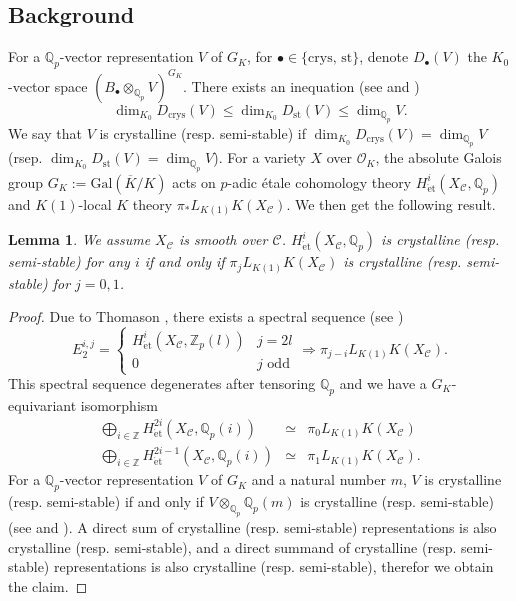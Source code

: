 \documentclass[11pt]{amsart}
\newcommand{\Q}{\mathbb{Q}}
\newcommand{\Z}{\mathbb{Z}}
\newcommand{\sC}{\mathcal{C}}
\newcommand{\sO}{\mathcal{O}}
\newcommand{\LK}{{L_{K(1)}}}
\newcommand{\et}{{\operatorname{\acute{e}t}}}
\newcommand{\ol}{\overline}
\newcounter{spec}
\newtheorem{lemma}{Lemma}[section]
\theoremstyle{definition}
\theoremstyle{remark}
\numberwithin{equation}{section}
\begin{document}
\subsection{Background} For a $\Q_p$-vector representation $V$ of $G_K$, for $\bullet\in \{\text{crys, st}\}$, denote $D_\bullet(V)$ the $K_0$-vector space $(B_\bullet\otimes_{\Q_p}V)^{G_K}$. There exists an inequation (see \cite{Fontainecrys} and \cite{Fontainesemi})
\[
\dim_{K_0}D_{\text{crys}}(V) \leq \dim_{K_0}D_{\text{st}}(V) \leq \dim_{\Q_p} V.
\]
We say that $V$ is crystalline (resp. semi-stable) if $\dim_{K_0}D_{\text{crys}}(V)=\dim_{\Q_p} V$ (rsep. $\dim_{K_0}D_{\text{st}}(V) = \dim_{\Q_p} V$). For a variety $X$ over $\sO_K$, the absolute Galois group $G_K:=\text{Gal}(\ol{K}/K)$ acts on $p$-adic \'etale cohomology theory $H^i_{\et}(X_\sC,\Q_p)$ and $K(1)$-local $K$ theory $\pi_*\LK K(X_\sC)$. We then get the following result.
\begin{lemma}
 We assume $X_\sC$ is smooth over $\sC$. $H^i_{\et}(X_\sC,\Q_p)$ is crystalline (resp. semi-stable) for any $i$ if and only if $\pi_j\LK K(X_\sC)$ is crystalline (resp. semi-stable) for $j=0,1$.
\end{lemma}
\begin{proof}
Due to Thomason \cite{Thomason}, there exists a spectral sequence (see \cite[(0.1)]{Thomason})
\begin{equation}\label{bakido}
E_2^{i,j}=\left\{
\begin{array}{ll}
H^{i}_\et(X_\sC,\Z_p(l)) & j = 2l \\
0 & j \text{ odd} 
\end{array}
\right. \Longrightarrow \pi_{j-i} L_{K(1)}K(X_\sC).
\end{equation} 
This spectral sequence degenerates after tensoring $\mathbb{Q}_p$ and we have a $G_K$-equivariant isomorphism
\begin{eqnarray}
  \bigoplus_{i\in\Z} H_\et^{2i}(X_\sC,\Q_p(i)) &\simeq & \pi_0L_{K(1)}K(X_\sC)\label{even02}\\
   \bigoplus_{i\in\Z} H_\et^{2i-1}(X_\sC,\Q_p(i)) &\simeq &\pi_1L_{K(1)}K(X_\sC)\label{odd03}.
\end{eqnarray}
For a $\Q_p$-vector representation $V$ of $G_K$ and a natural number $m$, $V$ is crystalline (resp. semi-stable) if and only if $V\otimes_{\Q_p} \Q_p(m)$ is crystalline (resp. semi-stable) (see \cite[5.2 Theorem i)]{Fontainecrys} and \cite[Proposition 1.5.2, Proposition 5.1.2]{Fontainesemi}). A direct sum of crystalline (resp. semi-stable) representations is also crystalline (resp. semi-stable), and a direct summand of crystalline (resp. semi-stable) representations is also crystalline (resp. semi-stable), therefor we obtain the claim.
\end{proof}
\end{document}
